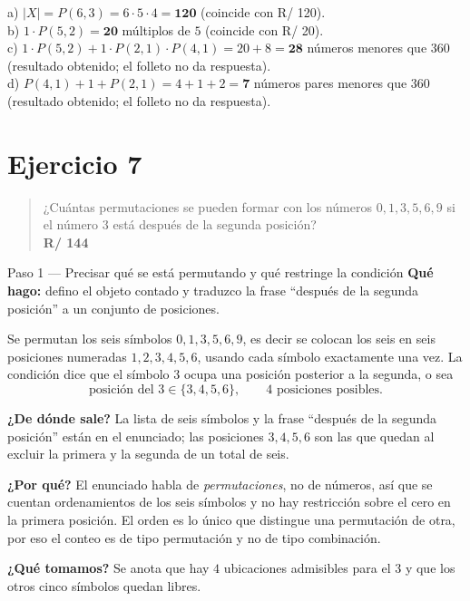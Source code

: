 \documentclass[11pt]{article}
\begin{document}
\begin{resp}
a) $|X|=P(6,3)=6\cdot 5\cdot 4=\mathbf{120}$ (coincide con R/ 120).\\
b) $1\cdot P(5,2)=\mathbf{20}$ múltiplos de $5$ (coincide con R/ 20).\\
c) $1\cdot P(5,2)+1\cdot P(2,1)\cdot P(4,1)=20+8=\mathbf{28}$ números menores que $360$ (resultado obtenido; el folleto no da respuesta).\\
d) $P(4,1)+1+P(2,1)=4+1+2=\mathbf{7}$ números pares menores que $360$ (resultado obtenido; el folleto no da respuesta).
\end{resp}

\section*{Ejercicio 7}

\begin{quote}
¿Cuántas permutaciones se pueden formar con los números $0,1,3,5,6,9$ si el número 3 está después de la segunda posición?\\[2pt]
\textbf{R/ 144}
\end{quote}

\begin{paso}{Paso 1 --- Precisar qué se está permutando y qué restringe la condición}
\textbf{Qué hago:} defino el objeto contado y traduzco la frase ``después de la segunda posición'' a un conjunto de posiciones.

Se permutan los seis símbolos $0,1,3,5,6,9$, es decir se colocan los seis en seis posiciones numeradas $1,2,3,4,5,6$, usando cada símbolo exactamente una vez. La condición dice que el símbolo $3$ ocupa una posición posterior a la segunda, o sea
\[
  \text{posición del }3 \in \{3,4,5,6\},\qquad \text{4 posiciones posibles}.
\]

\textbf{¿De dónde sale?} La lista de seis símbolos y la frase ``después de la segunda posición'' están en el enunciado; las posiciones $3,4,5,6$ son las que quedan al excluir la primera y la segunda de un total de seis.

\textbf{¿Por qué?} El enunciado habla de \emph{permutaciones}, no de números, así que se cuentan ordenamientos de los seis símbolos y no hay restricción sobre el cero en la primera posición. El orden es lo único que distingue una permutación de otra, por eso el conteo es de tipo permutación y no de tipo combinación.

\textbf{¿Qué tomamos?} Se anota que hay $4$ ubicaciones admisibles para el $3$ y que los otros cinco símbolos quedan libres.
\end{paso}
\end{document}
